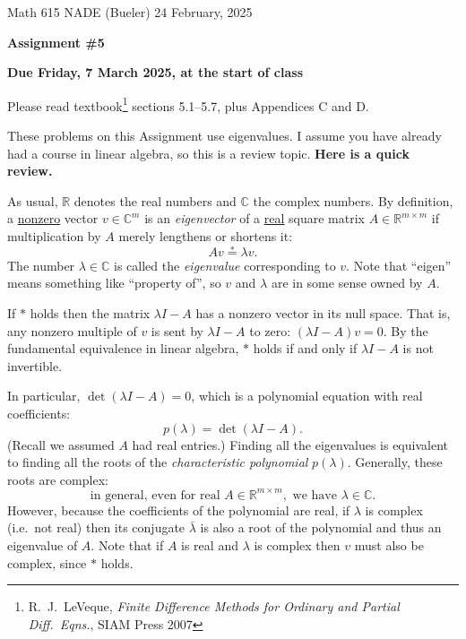 \documentclass[12pt]{amsart}
\newcommand{\CC}{\mathbb{C}}
\newcommand{\RR}{\mathbb{R}}
\begin{document}
\scriptsize \noindent Math 615 NADE (Bueler) \hfill 24 February, 2025
\normalsize

\medskip\bigskip

\Large\centerline{\textbf{Assignment \#5}}
\large
\bigskip

\centerline{\textbf{Due Friday, 7 March 2025, at the start of class}}
\bigskip
\normalsize

\thispagestyle{empty}

\bigskip
Please read textbook\footnote{R.~J.~LeVeque, \emph{Finite Difference Methods for Ordinary and Partial Diff.~Eqns.}, SIAM Press 2007} sections 5.1–5.7, plus Appendices C and D.

\bigskip
\noindent \hrulefill

These problems on this Assignment use eigenvalues.  I assume you have already had a course in linear algebra, so this is a review topic.  \textbf{Here is a quick review.}

As usual, $\RR$ denotes the real numbers and $\CC$ the complex numbers.  By definition, a \underline{nonzero} vector $v\in \CC^m$ is an \emph{eigenvector} of a \underline{real} square matrix $A \in \RR^{m\times m}$ if multiplication by $A$ merely lengthens or shortens it:
\begin{equation*}
    A v \stackrel{\ast}{=} \lambda v.
\end{equation*}
The number $\lambda \in \CC$ is called the \emph{eigenvalue} corresponding to $v$.  Note that ``eigen'' means something like ``property of'', so $v$ and $\lambda$ are in some sense owned by $A$.

If $\ast$ holds then the matrix $\lambda I - A$ has a nonzero vector in its null space.  That is, any nonzero multiple of $v$ is sent by $\lambda I - A$ to zero: $(\lambda I - A) v = 0$.  By the fundamental equivalence in linear algebra, $\ast$ holds if and only if $\lambda I - A$ is not invertible.

In particular, $\det(\lambda I - A) = 0$, which is a polynomial equation with real coefficients:
    $$p(\lambda) = \det(\lambda I - A).$$
(Recall we assumed $A$ had real entries.)  Finding all the eigenvalues is equivalent to finding all the roots of the \emph{characteristic polynomial} $p(\lambda)$.  Generally, these roots are complex:
    $$\text{in general, even for real } A \in \RR^{m\times m}, \text{ we have } \lambda\in \CC.$$
However, because the coefficients of the polynomial are real, if $\lambda$ is complex (i.e.~not real) then its conjugate $\bar \lambda$ is also a root of the polynomial and thus an eigenvalue of $A$.  Note that if $A$ is real and $\lambda$ is complex then $v$ must also be complex, since $\ast$ holds.
\end{document}
